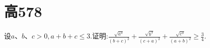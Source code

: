 \documentclass[]{article}
\title{}
\author{}
\date{}
\begin{document}
\maketitle
\section{高578}{
设$a、b、c>0,a+b+c\leq 3.$证明:$\displaystyle\frac{\sqrt{a^3}}{(b+c)^2}+\frac{\sqrt{b^3}}{(c+a)^2}+\frac{\sqrt{c^3}}{(a+b)^2}\geq \frac{3}{4}$.
}
\end{document}

